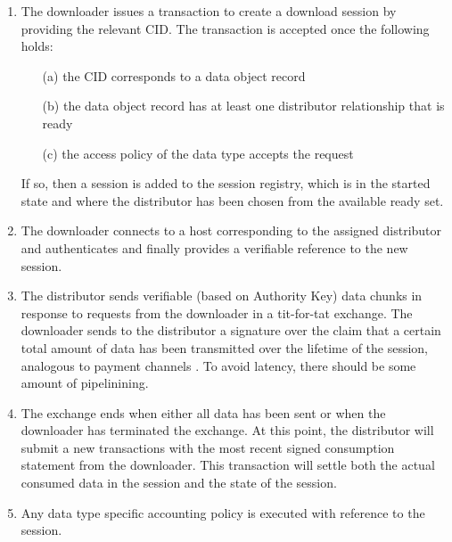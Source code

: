 \documentclass{article}
\begin{document}
\begin{enumerate}

\item
The downloader issues a transaction to create a download session by providing the relevant CID. The transaction is accepted once the following holds:

      \begin{itemize}

      \item[(a)] the CID corresponds to a data object record

      \item[(b)] the data object record has at least one distributor relationship that is ready

      \item[(c)] the access policy of the data type accepts the request

      \end{itemize}

If so, then a session is added to the session registry, which is in the started state and where the distributor has been chosen from the available ready set.

\item
The downloader connects to a host corresponding to the assigned distributor and authenticates and finally provides a verifiable reference to the new session.

\item
The distributor sends verifiable (based on Authority Key) data chunks in response to requests from the downloader in a tit-for-tat exchange. The downloader sends to the distributor a signature over the claim that a certain total amount of data has been transmitted over the lifetime of the session, analogous to payment channels \cite{payment_channels}. To avoid latency, there should be some amount of pipelinining.

\item
The exchange ends when either all data has been sent or when the downloader has terminated the exchange. At this point, the distributor will submit a new transactions with the most recent signed consumption statement from the downloader. This transaction will settle both the actual consumed data in the session and the state of the session.

\item
Any data type specific accounting policy is executed with reference to the session.

\end{enumerate}
\end{document}
